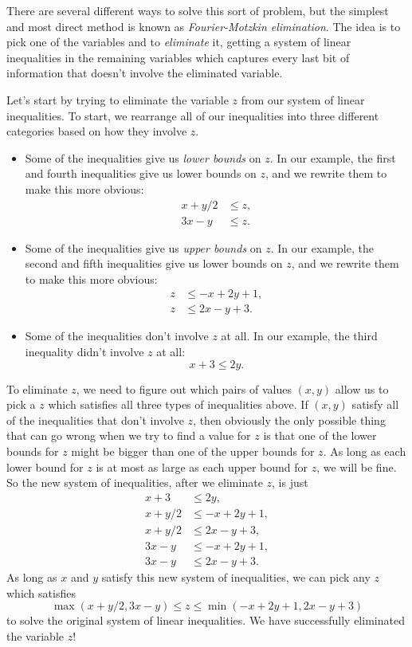 There are several different ways to solve this sort of problem, but the simplest and most direct method is known as \emph{Fourier-Motzkin elimination}. The idea is to pick one of the variables and to \emph{eliminate} it, getting a system of linear inequalities in the remaining variables which captures every last bit of information that doesn't involve the eliminated variable.

Let's start by trying to eliminate the variable $z$ from our system of linear inequalities. To start, we rearrange all of our inequalities into three different categories based on how they involve $z$.
\begin{itemize}
\item Some of the inequalities give us \emph{lower bounds} on $z$. In our example, the first and fourth inequalities give us lower bounds on $z$, and we rewrite them to make this more obvious:
\begin{align*}
x + y/2 &\le z,\\
3x - y &\le z.
\end{align*}

\item Some of the inequalities give us \emph{upper bounds} on $z$. In our example, the second and fifth inequalities give us lower bounds on $z$, and we rewrite them to make this more obvious:
\begin{align*}
z &\le -x + 2y + 1,\\
z &\le 2x - y + 3.
\end{align*}

\item Some of the inequalities don't involve $z$ at all. In our example, the third inequality didn't involve $z$ at all:
\[
x + 3 \le 2y.
\]
\end{itemize}
To eliminate $z$, we need to figure out which pairs of values $(x,y)$ allow us to pick a $z$ which satisfies all three types of inequalities above. If $(x,y)$ satisfy all of the inequalities that don't involve $z$, then obviously the only possible thing that can go wrong when we try to find a value for $z$ is that one of the lower bounds for $z$ might be bigger than one of the upper bounds for $z$. As long as each lower bound for $z$ is at most as large as each upper bound for $z$, we will be fine. So the new system of inequalities, after we eliminate $z$, is just
\begin{align*}
x + 3 &\le 2y,\\
x + y/2 &\le -x + 2y + 1,\\
x + y/2 &\le 2x - y + 3,\\
3x - y &\le -x + 2y + 1,\\
3x - y &\le 2x - y + 3.
\end{align*}
As long as $x$ and $y$ satisfy this new system of inequalities, we can pick any $z$ which satisfies
\[
\max(x + y/2, 3x-y) \le z \le \min(-x + 2y + 1, 2x - y + 3)
\]
to solve the original system of linear inequalities. We have successfully eliminated the variable $z$!

